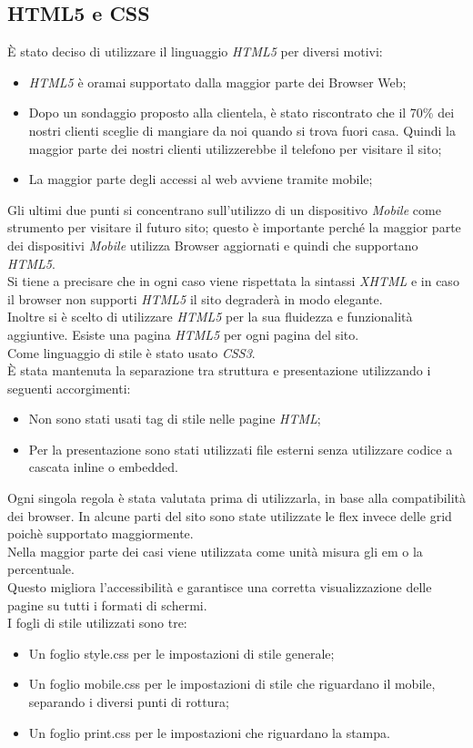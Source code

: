 \subsection{HTML5 e CSS}
È stato deciso di utilizzare il linguaggio \emph{HTML5} per diversi motivi:
\begin{itemize} %
	\item \emph{HTML5} è oramai supportato dalla maggior parte dei Browser Web;
	\item Dopo un sondaggio proposto alla clientela, è stato riscontrato che il 70\% dei nostri clienti sceglie di mangiare da noi quando si trova fuori casa. 
	Quindi la maggior parte dei nostri clienti utilizzerebbe il telefono per visitare il sito;
	\item La maggior parte degli accessi al web avviene tramite mobile;
\end{itemize}
Gli ultimi due punti si concentrano sull'utilizzo di un dispositivo \emph{Mobile} come strumento per visitare il futuro sito; questo è importante perché la maggior parte dei dispositivi \emph{Mobile} utilizza Browser aggiornati e quindi che supportano \emph{HTML5}.\\
Si tiene a precisare che in ogni caso viene rispettata la sintassi \emph{XHTML} e in caso il browser non supporti \emph{HTML5} il sito degraderà in modo elegante.\\
Inoltre si è scelto di utilizzare \emph{HTML5} per la sua fluidezza e funzionalità aggiuntive. %
Esiste una pagina \emph{HTML5} per ogni pagina del sito.\\ %
Come linguaggio di stile è stato usato \emph{CSS3}.\\
È stata mantenuta la separazione tra struttura e presentazione utilizzando i seguenti accorgimenti: 
\begin{itemize}
    \item Non sono stati usati tag di stile nelle pagine \emph{HTML};
    \item Per la presentazione sono stati utilizzati file esterni senza utilizzare codice a cascata inline o embedded.
\end{itemize}
Ogni singola regola è stata valutata prima di utilizzarla, in base alla compatibilità dei browser.
In alcune parti del sito sono state utilizzate le flex invece delle grid poichè supportato maggiormente.\\
Nella maggior parte dei casi viene utilizzata come unità misura gli em o la percentuale.\\
Questo migliora l'accessibilità e garantisce una corretta visualizzazione delle pagine su tutti i formati di schermi.\\
I fogli di stile utilizzati sono tre:
\begin{itemize}
	\item Un foglio style.css per le impostazioni di stile generale;
	\item Un foglio mobile.css per le impostazioni di stile che riguardano il mobile, separando i diversi punti di rottura; %
	\item Un foglio print.css per le impostazioni che riguardano la stampa.
\end{itemize}